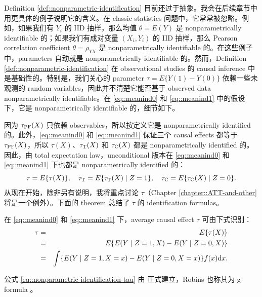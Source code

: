 Definition \ref{def::nonparametric-identification} 目前还过于抽象。我会在后续章节中用更具体的例子说明它的含义。在 classic statistics 问题中，它常常被忽略。例如，如果我们有 $Y_i$ 的 IID 抽样，那么均值 $\theta = E(Y)$ 是 nonparametrically identifiable 的；如果我们有成对变量 $(X_i, Y_i)$ 的 IID 抽样，那么 Pearson correlation coefficient $\theta = \rho_{YX}$ 是 nonparametrically identifiable 的。在这些例子中，parameters 自动就是 nonparametrically identifiable 的。然而，Definition \ref{def::nonparametric-identification} 在 observational studies 的 causal inference 中是基础性的。特别是，我们关心的 parameter $\tau = E\{ Y(1)  - Y(0)\}$ 依赖一些未观测的 random variables，因此并不清楚它能否基于 observed data nonparametrically identifiable。在 \eqref{eq::meanind0} 和 \eqref{eq::meanind1} 中的假设下，它是 nonparametrically identifiable 的，细节如下。 


 因为 $   \tau_\textsc{PF}(X)$ 只依赖 observables，所以按定义它是 nonparametrically identified 的。此外，\eqref{eq::meanind0} 和 \eqref{eq::meanind1} 保证三个 causal effects 都等于 $   \tau_\textsc{PF}(X)$，所以 $\tau(X) $、$\tau_\textsc{T}(X) $ 和 $  \tau_\textsc{C}(X)$ 都是 nonparametrically identified 的。因此，由 total expectation law，unconditional 版本在 \eqref{eq::meanind0} 和 \eqref{eq::meanind1} 下也都是 nonparametrically identified 的：
 $$
 \tau = E\{ \tau(X)\},\quad
 \tau_\textsc{T} = E\{  \tau_\textsc{T}(X) \mid Z=1  \}, \quad
   \tau_\textsc{C} = E\{   \tau_\textsc{C}(X) \mid Z=0 \}.
 $$
 从现在开始，除非另有说明，我将重点讨论 $\tau$（Chapter \ref{chapter::ATT-and-other} 将是一个例外）。下面的 theorem 总结了 $\tau$ 的 identification formulas。 
 
\begin{theorem}
\label{thm::identification-formula}
在 \eqref{eq::meanind0} 和 \eqref{eq::meanind1} 下，average causal effect $\tau$ 可由下式识别：
 \begin{eqnarray} 
 \tau &=& E\{ \tau(X)\} \\
 &=& E\{  E(Y\mid Z=1, X) - E(Y\mid Z=0, X) \} \label{eq::nonparametric-identification-tau} \\
 &=&  \int \{  E(Y\mid Z=1, X=x) - E(Y\mid Z=0, X=x)\} f(x) \textup{d} x.
 \end{eqnarray}
\end{theorem} 
 
公式 \eqref{eq::nonparametric-identification-tau} 由 \citet{rosenbaum1983central} 正式建立，Robins 也称其为 g-formula \citep[see][]{hernan2020causal}。
 
